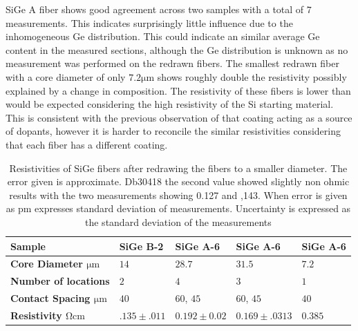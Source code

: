 SiGe A fiber shows good agreement across two samples with a total of $7$ measurements. This indicates surprisingly little influence due to the inhomogeneous Ge distribution. This could indicate an similar average Ge content in the measured sections, although the Ge distribution is unknown as no measurement was performed on the redrawn fibers. The smallest redrawn fiber with a core diameter of only $7.2 \si{\micro\meter}$ shows roughly double the resistivity possibly explained by a change in composition.  %
The resistivity of these fibers is lower than would be expected considering the high resistivity of the Si starting material. This is consistent with the previous observation of that coating acting as a source of dopants, however it is harder to reconcile the similar resistivities considering that each fiber has a different coating. 


\begin{table}[!h]
\begin{center}
\begin{tabular}{ | l | l | l | l | l |}
\hline
\textbf{Sample}& SiGe B-2 & SiGe A-6 & SiGe A-6 & SiGe A-6\\ \hline
\textbf{Core Diameter $\si{\micro \meter}$}& $14$ & $28.7$ &$31.5$&$7.2$\\\hline
\textbf{Number of locations}& $2$ &$4$&$ 3$&$1$ \\\hline
\textbf{Contact Spacing $\si{\micro \meter}$}&$40$ &$60$, $45$& $60$, $45$ &$40$\\\hline
\textbf{Resistivity $\si{\ohm \cm}$}& $.135 \pm .011$ &$0.192 \pm 0.02$ &$ 0.169 \pm .0313 $&$0.385$ \\\hline
\end{tabular}
\end{center}
\caption{Resistivities of SiGe fibers after redrawing the fibers to a smaller diameter. The error given is approximate. Db30418 the second value showed slightly non ohmic results with the two measurements showing 0.127 and ,143. When error is given as pm expresses standard deviation of measurements. Uncertainty is expressed as the standard deviation of the measurements}
\label{redraw_resistivity}
\end{table}

